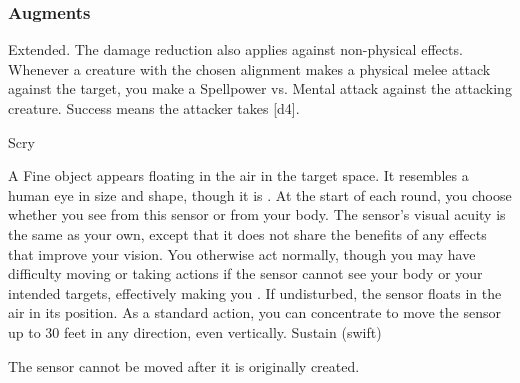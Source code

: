 \subsubsection{Augments}
 Extended.
The damage reduction also applies against non-physical effects.
Whenever a creature with the chosen alignment makes a physical melee attack against the target, you make a Spellpower vs. Mental attack against the attacking creature.
Success means the attacker takes [d4].
\begin{spellsection}{Scry}
\begin{spellheader}
\end{spellheader}
\begin{spellcontent}
\begin{spelltargetinginfo}
\end{spelltargetinginfo}
\begin{spelleffects}
\spelleffect
A Fine object appears floating in the air in the target space.
It resembles a human eye in size and shape, though it is .
At the start of each round, you choose whether you see from this sensor or from your body.
The sensor's visual acuity is the same as your own, except that it does not share the benefits of any  effects that improve your vision.
You otherwise act normally, though you may have difficulty moving or taking actions if the sensor cannot see your body or your intended targets, effectively making you \blinded.
If undisturbed, the sensor floats in the air in its position.
As a standard action, you can concentrate to move the sensor up to 30 feet in any direction, even vertically.
\spelldur Sustain (swift)
\end{spelleffects}
\end{spellcontent}
\begin{spellfooter}
\miscastexplode
\end{spellfooter}
\begin{spellcantrip}
The sensor cannot be moved after it is originally created.
\end{spellcantrip}
\end{spellsection}

